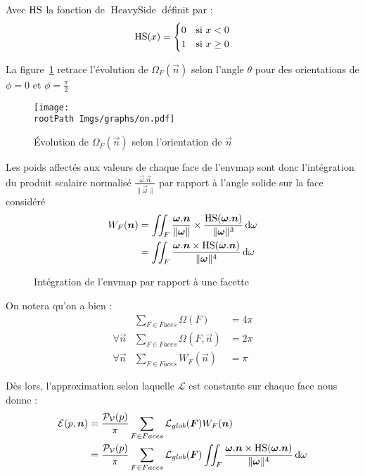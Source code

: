 \documentclass[10pt,a4paper,twoside, twocolumn]{report}
\newcommand*{\rootPath}{../}
\begin{document}
Avec $\operatorname{HS}$ la fonction de $\operatorname{HeavySide}$ définit par :
\begin{align}
	\operatorname{HS}(x) = \begin{cases} 0 &\text{si } x<0 \\ 1 & \text{si } x\geq 0\end{cases} \notag
\end{align}

La figure~\ref{fig:curve:omega_theta} retrace l’évolution de $\Omega_F(\vec n)$ selon l’angle $\theta$ pour des orientations de $\phi=0$ et $\phi=\frac{\pi}{2}$

\begin{figure}[!ht]\centering
	\texttt{[image: \\rootPath Imgs/graphs/on.pdf]}
	\caption{Évolution de $\Omega_F(\vec n)$ selon l’orientation de $\vec n$}
	\label{fig:curve:omega_theta}
\end{figure}

Les poids affectés aux valeurs de chaque face de l’envmap sont donc l’intégration du produit scalaire normalisé $\frac{\vec\omega.\vec n}{\|\vec \omega\|}$ par rapport à l’angle solide sur la face considéré
\begin{align}
	W_F(\vec n)
		&= \iint_{F}\frac{\vec\omega.\vec n}{\|\vec \omega\|}\times\frac{\Hs(\vec\omega.\vec n)}{\|\vec\omega\|^3}\, \mathrm d\omega \notag\\
		&= \iint_{F}\frac{\vec\omega.\vec n\times\Hs(\vec\omega.\vec n)}{\|\vec\omega\|^4}\, \mathrm d\omega
		\label{ref:eq:wintegral}
\end{align}

\begin{figure}[!ht]
	\centering
	
	\caption{Intégration de l’envmap par rapport à une facette}
	\label{fig:tikz:envmapFacet}
\end{figure}

On notera qu’on a bien :
\begin{subequations}
	\begin{align}
					& \sum_{F \in Faces} \Omega(F) 								&=4\pi\\
	\forall \vec n	& \sum_{F \in Faces} \Omega(F,\vec n)	&=2\pi\\	
	\forall \vec n	& \sum_{F \in Faces} W_F(\vec n)			&=\pi	
	\end{align}
\end{subequations}

Dès lors, l’approximation selon laquelle $\mathcal L$ est constante sur chaque face nous donne :
\begin{align}
	\mathcal E(p, \vec n)
		& = \frac{\mathcal P_{\mathcal V}(p)}{\pi}\sum_{F \in Faces}\mathcal L_{glob}(\vec F)W_F(\vec n) \notag \\
		& = \frac{\mathcal P_{\mathcal V}(p)}{\pi}\sum_{F \in Faces}\mathcal L_{glob}(\vec F)\iint_{F}\frac{\vec\omega.\vec n\times\Hs(\vec\omega.\vec n)}{\|\vec\omega\|^4}\, \mathrm d\omega
		\label{ref:eq:sumintegral_model}
\end{align}
\end{document}
